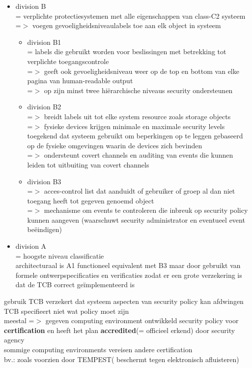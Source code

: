 \documentclass{report}
\begin{document}
\begin{itemize}
\begin{itemize}
\end{itemize}
\item division B
\\ = verplichte protectiesystemen met alle eigenschappen van class-C2 systeem
\\ =$>$ voegen gevoeligheidsniveaulabels toe aan elk object in systeem
\begin{itemize}
\item division B1
\\ = labels die gebruikt worden voor beslissingen met betrekking tot verplichte toegangscontrole
\\=$>$ geeft ook gevoeligheidsniveau weer op de top en bottom van elke pagina van human-readable output
\\=$>$ op zijn minst twee hi\"erarchische niveaus security ondersteunen
\item division B2
\\=$>$ breidt labels uit tot elke system resource zoals storage objects
\\=$>$ fysieke devices krijgen minimale en maximale security levels toegekend dat systeem gebruikt om beperkingen op te leggen gebaseerd op de fysieke omgevingen waarin de devices zich bevinden 
\\=$>$ ondersteunt covert channels en auditing van events die kunnen leiden tot uitbuiting van covert channels
\item division B3
\\ =$>$ acces-control list dat aanduidt of gebruiker of groep al dan niet toegang heeft tot gegeven genoemd object
\\=$>$ mechanisme om events te controleren die inbreuk op security policy kunnen aangeven (waarschuwt security administrator en eventueel event be\"eindigen)
\end{itemize}
\item division A
\\= hoogste niveau classificatie
\\architecturaal is A1 functioneel equivalent met B3 maar door gebruikt van formele ontwerpspecificaties en verificaties zodat er een grote verzekering is dat de TCB correct ge\"implementeerd is

\end{itemize}
gebruik TCB verzekert dat systeem aspecten van security policy kan afdwingen
\\TCB specifieert niet wat policy moet zijn
\\meestal =$>$ gegeven computing environment ontwikkeld security policy voor \textbf{certification}
en heeft het plan \textbf{accredited}(= officieel erkend) door security agency
\\sommige computing environments vereisen andere certification
\\bv.: zoals voorzien door TEMPEST( beschermt tegen elektronisch afluisteren)
\end{document}
